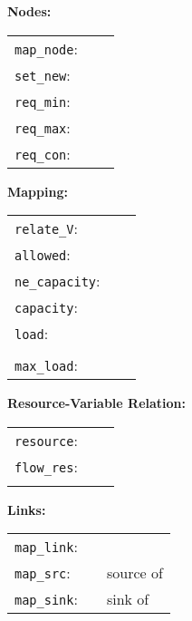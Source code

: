 \documentclass[conference,10pt]{IEEEtran}
\begin{document}
\begin{figure*} [tb!]   \begin{scriptsize}
\noindent \textbf{\normalsize Nodes:}

\vspace*{1mm}
\begin{tabular}{lll}
  \texttt{map\_node}: &  &  \\
  \texttt{set\_new}: &  &
   \\
  \texttt{req\_min}: &  &  \\   \texttt{req\_max}: &  &  \\
  \texttt{req\_con}: &  & 
\end{tabular}

\vspace*{1mm}

\noindent \textbf{\normalsize Mapping:}

\vspace*{1mm}

\begin{tabular}{l l l}
  \texttt{relate\_V}: &  &  \\
  \texttt{allowed}: &  &  \\
  \texttt{ne\_capacity}: &  &  \\
  \texttt{capacity}: &  &  \\
  \texttt{load}: &  &  \\
   &  & \\
  \texttt{max\_load}: &  & 
\end{tabular}


\vspace*{1mm}

\noindent \textbf{\normalsize Resource-Variable Relation:}

\vspace*{1mm}

\begin{tabular}{l l l}
  \texttt{resource}: & 
    &  \\
  \texttt{flow\_res}: & 
    & \\
	& & \\
\end{tabular}

\vspace*{1mm}

\noindent \textbf{\normalsize Links:}

\vspace*{1mm}

\begin{tabular}{l l l}
  \texttt{map\_link}: & 
  &  \\
\texttt{map\_src}: &  &  source of   \\
\texttt{map\_sink}: &  &  sink of  \\  \end{tabular}


\end{scriptsize}
\end{figure*}
\end{document}
